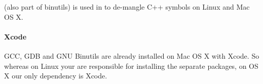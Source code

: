  (also part of binutils) is used in  to de-mangle C++ symbols on Linux and Mac OS X.

\paragraph{Xcode} GCC, GDB and GNU Binutils are already installed on Mac OS X with Xcode.  So whereas on Linux your are responsible for installing the separate packages, on OS X our only dependency is Xcode.

